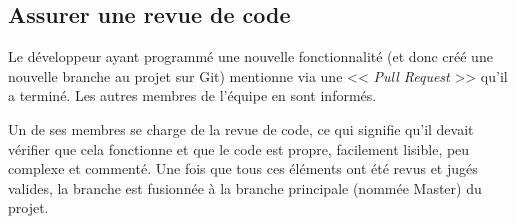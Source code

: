 \documentclass[12pt,a4paper,openany]{article}
\begin{document}
	\subsection{Assurer une revue de code}
	    Le développeur ayant programmé une nouvelle fonctionnalité (et donc créé une nouvelle branche au projet sur Git) mentionne via une <<
		\textit{Pull Request} >> qu'il a terminé.  Les autres membres de l'équipe en sont informés. 
		
		Un de ses membres se charge de la revue de code, ce qui signifie
		qu'il devait vérifier que cela fonctionne et que le code est propre, facilement lisible, peu complexe et commenté. Une fois que tous ces
		éléments ont été revus et jugés valides, la branche est fusionnée à la branche principale (nommée Master) du projet. 
\end{document}
